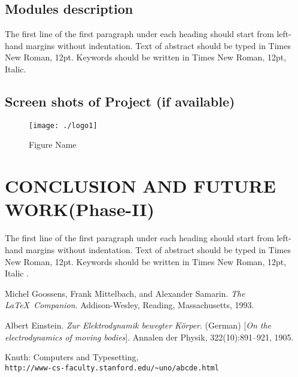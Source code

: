 \documentclass[a4paper, 12pt]{report}
\begin{document}
\section{Modules description}
\par The first line of the first paragraph under each heading should start from left-hand margins without indentation.  Text of abstract should be typed in Times New Roman, 12pt. Keywords should be written in Times New Roman, 12pt, Italic.\\
\section{Screen shots of Project (if available)}
\begin{figure}[h]
\centering
\texttt{[image: ./logo1]} %
\caption{Figure Name}
\end{figure}
\chapter{CONCLUSION AND FUTURE WORK(Phase-II)}
\par The first line of the first paragraph under each heading should start from left-hand margins without indentation.  Text of abstract should be typed in Times New Roman, 12pt. Keywords should be written in Times New Roman, 12pt, Italic \cite{knuthwebsite}.\\

\begin{thebibliography}{9}
Michel Goossens, Frank Mittelbach, and Alexander Samarin. 
\textit{The \LaTeX\ Companion}. 
Addison-Wesley, Reading, Massachusetts, 1993.

Albert Einstein. 
\textit{Zur Elektrodynamik bewegter K{\"o}rper}. (German) 
[\textit{On the electrodynamics of moving bodies}]. 
Annalen der Physik, 322(10):891–921, 1905.

Knuth: Computers and Typesetting,
\\\texttt{http://www-cs-faculty.stanford.edu/\~{}uno/abcde.html}
\end{thebibliography}
\end{document}

